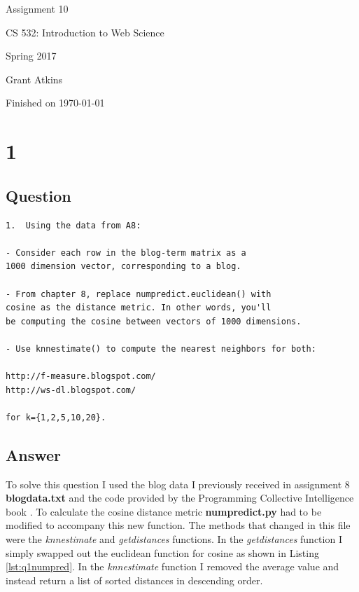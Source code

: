 \documentclass[letterpaper,11pt]{article}
\begin{document}
\begin{titlepage}

\begin{center}

\Huge{Assignment 10}

\Large{CS 532:  Introduction to Web Science}

\Large{Spring 2017}

\Large{Grant Atkins}

\Large Finished on \today

\end{center}

\end{titlepage}

\newpage


\section*{1}

\subsection*{Question}

\begin{verbatim}
1.  Using the data from A8:

- Consider each row in the blog-term matrix as a 
1000 dimension vector, corresponding to a blog.  

- From chapter 8, replace numpredict.euclidean() with 
cosine as the distance metric. In other words, you'll 
be computing the cosine between vectors of 1000 dimensions.  

- Use knnestimate() to compute the nearest neighbors for both:

http://f-measure.blogspot.com/
http://ws-dl.blogspot.com/

for k={1,2,5,10,20}.
\end{verbatim}

\clearpage
\subsection*{Answer}

To solve this question I used the blog data I previously received in assignment 8 \textbf{blogdata.txt} and the code provided by the Programming Collective Intelligence book \cite{collectiveIntell}. To calculate the cosine distance metric \textbf{numpredict.py} had to be modified to accompany this new function. The methods that changed in this file were the \textit{knnestimate} and \textit{getdistances} functions. In the \textit{getdistances} function I simply swapped out the euclidean function for cosine as shown in Listing \ref{lst:q1numpred}. In the \textit{knnestimate} function I removed the average value and instead return a list of sorted distances in descending order.
\end{document}
